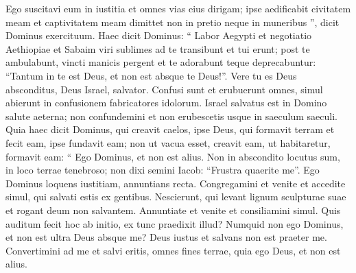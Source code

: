 \begin{biblechapter}
\begin{biblechapter}
\begin{biblechapter}
\begin{biblechapter}
\begin{biblechapter}
\begin{biblechapter}
\begin{biblechapter}
\begin{biblechapter}
\begin{biblechapter}
\begin{biblechapter}
\begin{biblechapter}
\begin{biblechapter}
\begin{biblechapter}
\begin{biblechapter}
\begin{biblechapter}
\begin{biblechapter}
\begin{biblechapter}
\begin{biblechapter}
\begin{biblechapter}
\begin{biblechapter}
\begin{biblechapter}
\begin{biblechapter}
\begin{biblechapter}
\begin{biblechapter}
\begin{biblechapter}
\begin{biblechapter}
\begin{biblechapter}
\begin{biblechapter}
\begin{biblechapter}
\begin{biblechapter}
\begin{biblechapter}
\begin{biblechapter}
\begin{biblechapter}
\begin{biblechapter}
\begin{biblechapter}
\begin{biblechapter}
\begin{biblechapter}
\begin{biblechapter}
\begin{biblechapter}
\begin{biblechapter}
\begin{biblechapter}
\begin{biblechapter}
\begin{biblechapter}
\begin{biblechapter}
\begin{biblechapter}
 \verse Ego suscitavi eum in iustitia
 et omnes vias eius dirigam;
 ipse aedificabit civitatem meam
 et captivitatem meam dimittet
 non in pretio neque in muneribus ”,
 dicit Dominus exercituum.
 \verse Haec dicit Dominus:
 “ Labor Aegypti et negotiatio Aethiopiae
 et Sabaim viri sublimes
 ad te transibunt et tui erunt;
 post te ambulabunt,
 vincti manicis pergent et te adorabunt
 teque deprecabuntur:
 “Tantum in te est Deus,
 et non est absque te Deus!”.
 \verse Vere tu es Deus absconditus,
 Deus Israel, salvator.
 \verse Confusi sunt et erubuerunt omnes,
 simul abierunt in confusionem fabricatores idolorum.
 \verse Israel salvatus est in Domino salute aeterna;
 non confundemini et non erubescetis
 usque in saeculum saeculi.
 \verse Quia haec dicit Dominus,
 qui creavit caelos, ipse Deus,
 qui formavit terram et fecit eam, ipse fundavit eam;
 non ut vacua esset, creavit eam,
 ut habitaretur, formavit eam:
 “ Ego Dominus, et non est alius.
 \verse Non in abscondito locutus sum,
 in loco terrae tenebroso;
 non dixi semini Iacob:
 “Frustra quaerite me”.
 Ego Dominus loquens iustitiam,
 annuntians recta.
 \verse Congregamini et venite et accedite simul,
 qui salvati estis ex gentibus.
 Nescierunt, qui levant lignum sculpturae suae
 et rogant deum non salvantem.
 \verse Annuntiate et venite et consiliamini simul.
 Quis auditum fecit hoc ab initio,
 ex tunc praedixit illud?
 Numquid non ego Dominus,
 et non est ultra Deus absque me?
 Deus iustus et salvans non est praeter me.
 \verse Convertimini ad me et salvi eritis,
 omnes fines terrae,
 quia ego Deus, et non est alius.

\end{biblechapter}
\end{biblechapter}
\end{biblechapter}
\end{biblechapter}
\end{biblechapter}
\end{biblechapter}
\end{biblechapter}
\end{biblechapter}
\end{biblechapter}
\end{biblechapter}
\end{biblechapter}
\end{biblechapter}
\end{biblechapter}
\end{biblechapter}
\end{biblechapter}
\end{biblechapter}
\end{biblechapter}
\end{biblechapter}
\end{biblechapter}
\end{biblechapter}
\end{biblechapter}
\end{biblechapter}
\end{biblechapter}
\end{biblechapter}
\end{biblechapter}
\end{biblechapter}
\end{biblechapter}
\end{biblechapter}
\end{biblechapter}
\end{biblechapter}
\end{biblechapter}
\end{biblechapter}
\end{biblechapter}
\end{biblechapter}
\end{biblechapter}
\end{biblechapter}
\end{biblechapter}
\end{biblechapter}
\end{biblechapter}
\end{biblechapter}
\end{biblechapter}
\end{biblechapter}
\end{biblechapter}
\end{biblechapter}
\end{biblechapter}
